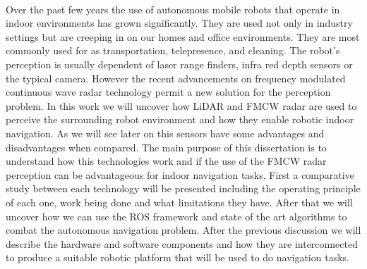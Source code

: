        
\EndTitlePage
\titlepage\ \endtitlepage %

\TitlePage
  \vspace*{55mm}
       {Over the past few years the use of autonomous mobile robots that operate in indoor environments has grown significantly. They are used not only in industry settings but are creeping in on our homes and office environments. They are most commonly used for as transportation, telepresence, and cleaning. The robot's perception is usually dependent of laser range finders, infra red depth sensors or the typical camera. However the recent advancements on frequency modulated continuous wave radar technology permit a new solution for the perception problem. In this work we will uncover how \ac{LiDAR} and \ac{FMCW} \ac{radar} are used to perceive the surrounding robot environment and how they enable robotic indoor navigation. As we will see later on this sensors have some advantages and disadvantages when compared. The main purpose of this dissertation is to understand how this technologies work and if the use of the \ac{FMCW} \ac{radar} perception can be advantageous for indoor navigation tasks. 
       }
       \TEXT{}     
       {First a comparative study between each  technology will be presented including the operating principle of each one, work being done and what limitations they have. After that we will uncover how we can use the \ac{ROS} framework and state of the art algorithms  to combat the autonomous navigation problem. After the previous discussion we will describe the hardware and software components and how they are interconnected to produce a suitable robotic platform that will be used to do navigation tasks.
        }
